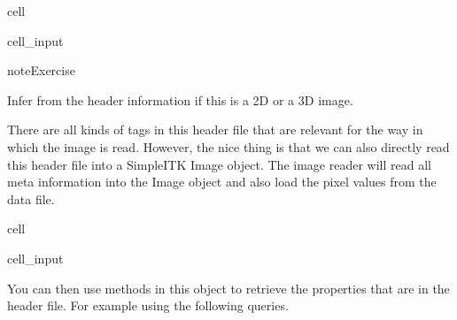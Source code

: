 \documentclass[letterpaper,10pt,english]{jupyterBook}
\begin{document}
\begin{sphinxuseclass}{cell}\begin{sphinxVerbatimInput}

\begin{sphinxuseclass}{cell_input}
\begin{sphinxVerbatim}[commandchars=\\\{\}]
     

   
       
\end{sphinxVerbatim}

\end{sphinxuseclass}\end{sphinxVerbatimInput}

\end{sphinxuseclass}
\begin{sphinxadmonition}{note}{Exercise}

\sphinxAtStartPar
Infer from the header information if this is a 2D or a 3D image.
\end{sphinxadmonition}

\sphinxAtStartPar
There are all kinds of tags in this header file that are relevant for the way in which the image is read. However, the nice thing is that we can also directly read this header file into a SimpleITK Image object. The image reader will read all meta information into the Image object and also load the pixel values from the data file.

\begin{sphinxuseclass}{cell}\begin{sphinxVerbatimInput}

\begin{sphinxuseclass}{cell_input}
\begin{sphinxVerbatim}[commandchars=\\\{\}]
  
\end{sphinxVerbatim}

\end{sphinxuseclass}\end{sphinxVerbatimInput}

\end{sphinxuseclass}
\sphinxAtStartPar
You can then use methods in this object to retrieve the properties that are in the header file. For example using the following queries.
\end{document}
